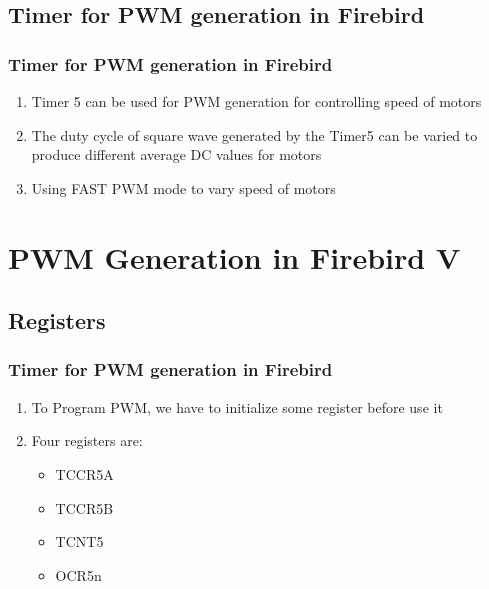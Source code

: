 \documentclass[10pt,red]{beamer}
\begin{document}
\subsection{Timer for PWM generation in Firebird}
\begin{frame}
	\frametitle{Timer for PWM generation in Firebird} \pause
		\begin{enumerate}
			\item<+-|alert@+> Timer 5 can be used for PWM generation for controlling speed of motors \\[10pt]
			\item<+-|alert@+> The duty cycle of square wave generated by the Timer5 can be varied to produce different average DC values for motors\\[10pt]
			\item<+-|alert@+> Using FAST PWM mode to vary speed of motors\\[10pt]
		\end{enumerate}
\end{frame}

\section{PWM Generation in Firebird V}
\subsection{Registers}
\begin{frame}
	\frametitle{Timer for PWM generation in Firebird} \pause
		\begin{enumerate}
			\item<+-|alert@+> To Program PWM, we have to initialize  some register before use it \\[10pt] 
			\item<+-|alert@+> Four registers are: \\[10pt]
			\begin{itemize}[number]	
				\item<+-|alert@+> TCCR5A \\[10pt]	 
				\item<+-|alert@+>	TCCR5B \\[10pt]
				\item<+-|alert@+>	TCNT5 \\[10pt] 	
				\item<+-|alert@+>	OCR5n \\[10pt]	
			\end{itemize}
		\end{enumerate}
\end{frame}
\end{document}
